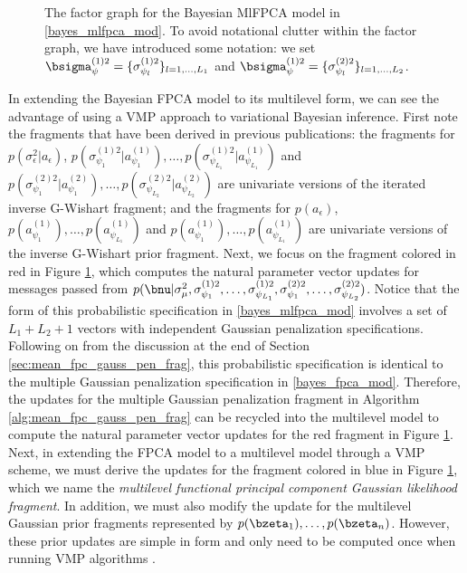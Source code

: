 \documentclass[ba]{imsart}
\numberwithin{equation}{section}
\theoremstyle{plain}
\def\sigsqeps{\sigma^2_{\epsilon}}
\def\aeps{a_{\epsilon}}
\def\sigsqmu{\sigma^2_{\mu}}
\newcommand\sigsqpsiL[2]{\sigma^{(#1) 2}_{\psi_{#2}}}
\newcommand\apsiL[2]{a^{(#1)}_{\psi_{#2}}}
\begin{document}
\begin{figure}
\caption{
	The factor graph for the Bayesian MlFPCA model in \eqref{bayes_mlfpca_mod}. To avoid notational
	clutter within the factor graph, we have introduced some notation: we set
	$\bsigma^{(1) 2}_\psi = \{ \sigsqpsiL{1}{l} \}_{l = 1, \dots, L_1}$ and
	$\bsigma^{(1) 2}_\psi = \{ \sigsqpsiL{2}{l} \}_{l = 1, \dots, L_2}$.
}
\label{fig:fg_mlfpca}
\end{figure}

In extending the Bayesian FPCA model to its multilevel form, we can see the advantage of using a VMP
approach to variational Bayesian inference. First note the fragments that have been derived
in previous publications:
the fragments for $p (\sigsqeps | \aeps)$, $p (\sigsqpsiL{1}{1} | \apsiL{1}{1}), \dots,
p (\sigsqpsiL{1}{L_1} | \apsiL{1}{L_1})$ and $p (\sigsqpsiL{2}{1} | \apsiL{2}{1}), \dots,
p (\sigsqpsiL{2}{L_2} | \apsiL{2}{L_2})$ are univariate versions of the iterated inverse G-Wishart fragment;
and the fragments for
$p (\aeps)$, $p (\apsiL{1}{1}), \allowbreak \dots, p (\apsiL{1}{L_1})$ and $p (\apsiL{1}{1}), \dots,
p (\apsiL{1}{L_1})$ are univariate versions of the inverse G-Wishart prior fragment. Next, we focus on
the fragment colored in red in Figure \ref{fig:fg_mlfpca}, which computes the natural parameter vector
updates for messages passed from
$p (\bnu | \sigsqmu, \sigsqpsiL{1}{1}, \dots, \allowbreak \sigsqpsiL{1}{L_1}, \sigsqpsiL{2}{1}, \dots, \sigsqpsiL{2}{L_2})$.
Notice that the form of this probabilistic specification in \eqref{bayes_mlfpca_mod}
involves a set of $L_1 + L_2 + 1$ vectors with independent Gaussian penalization specifications.
Following on from the discussion at the end of Section \ref{sec:mean_fpc_gauss_pen_frag},
this probabilistic specification is identical to the multiple Gaussian penalization specification in
\eqref{bayes_fpca_mod}. Therefore, the updates for the multiple Gaussian penalization
fragment in Algorithm \ref{alg:mean_fpc_gauss_pen_frag} can be recycled into the multilevel
model to compute the natural parameter vector updates for the red fragment in Figure
\ref{fig:fg_mlfpca}.
Next, in extending the FPCA model to a multilevel model through a VMP scheme,
we must derive the updates for the fragment colored in blue in Figure \ref{fig:fg_mlfpca},
which we name the \emph{multilevel functional principal component Gaussian likelihood
fragment}. In addition, we must also modify the update for the multilevel Gaussian prior
fragments represented by $p (\bzeta_1), \dots, p (\bzeta_n)$. However, these prior updates
are simple in form and only need to be computed once when running VMP algorithms
\citep{wand17}.
\end{document}
